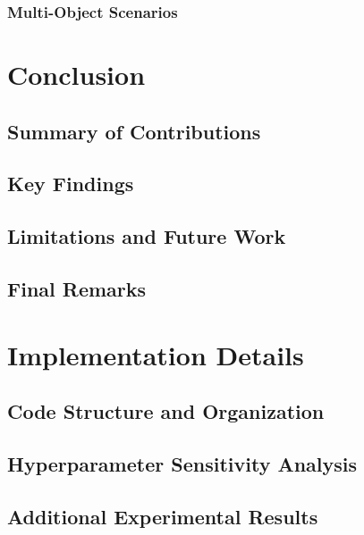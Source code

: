 \documentclass[
	english,
	ruledheaders=section,
	class=report,
	thesis={type=master},
	accentcolor=9c,
	custommargins=true,
	marginpar=false,
	parskip=half-,
	fontsize=11pt,
]{tudapub}
\begin{document}
\subsection{Multi-Object Scenarios}
\label{subsec:multi_object}

\chapter{Conclusion}
\label{chap:conclusion}

\section{Summary of Contributions}
\label{sec:summary_contributions}

\section{Key Findings}
\label{sec:key_findings}

\section{Limitations and Future Work}
\label{sec:limitations_future}

\section{Final Remarks}
\label{sec:final_remarks}

\printbibliography[title={References}]

\appendix

\chapter{Implementation Details}
\label{app:implementation}

\section{Code Structure and Organization}
\label{app:code_structure}

\section{Hyperparameter Sensitivity Analysis}
\label{app:hyperparameter_analysis}

\section{Additional Experimental Results}
\label{app:additional_results}
\end{document}

